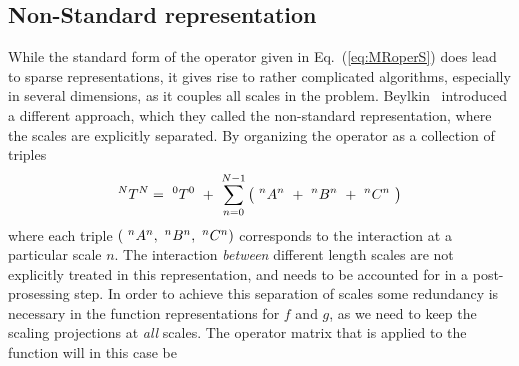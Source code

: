 \subsection{Non-Standard representation}
While the standard form of the operator given in Eq.~(\ref{eq:MRoperS}) does
lead to sparse representations, it gives rise to rather complicated algorithms,
especially in several dimensions, as it couples all scales in the problem. 
Beylkin~\etal \cite{Beylkin} introduced a different approach, which they called
the non-standard representation, where the scales are explicitly separated. By
organizing the operator as a collection of triples
\begin{equation}
    \T{N}{N} =\ \T{0}{0}\ +\ \sum_{n=0}^{N-1} \big(\ \A{n}{n}\ +\ \B{n}{n}\ +\ \C{n}{n}\ \big) 
\end{equation}
where each triple $(\ ^{n}A^{n},\ ^{n}B^{n},\ ^{n}C^{n})$ corresponds to the interaction
at a particular scale $n$. The interaction \emph{between} different length scales are
not explicitly treated in this representation, and needs to be accounted for in
a post-prosessing step. In order to achieve this separation of scales some redundancy
is necessary in the function representations for $f$ and $g$, as we need to keep the 
scaling projections at \emph{all} scales. The operator matrix that is applied to the 
function will in this case be
